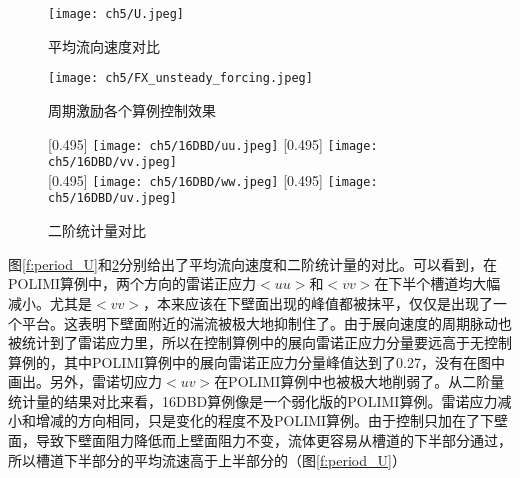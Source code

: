 \begin{figure}[htb]
\begin{minipage}{0.48\textwidth}
  \centering
  \texttt{[image: ch5/U.jpeg]}
  \caption{平均流向速度对比}\label{f:period_U}
\end{minipage}\hfill
\begin{minipage}{0.48\textwidth}
  \centering
  \texttt{[image: ch5/FX\_unsteady\_forcing.jpeg]}
  \caption{周期激励各个算例控制效果}\label{f:period_actuation}
\end{minipage}
\end{figure}
\begin{figure}[htb]
  \centering
  [0.495\textwidth] %
    {\texttt{[image: ch5/16DBD/uu.jpeg]}}%
  [0.495\textwidth]
    {\texttt{[image: ch5/16DBD/vv.jpeg]}}%
  \\\bigskip
  [0.495\textwidth] %
    {\texttt{[image: ch5/16DBD/ww.jpeg]}}%
  [0.495\textwidth]
    {\texttt{[image: ch5/16DBD/uv.jpeg]}}%
  \caption{二阶统计量对比}\label{f:period_2order}
\end{figure}
图\ref{f:period_U}和\ref{f:period_2order}分别给出了平均流向速度和二阶统计量的对比。可以看到，在POLIMI算例中，两个方向的雷诺正应力$<uu>$和$<vv>$在下半个槽道均大幅减小。尤其是$<vv>$，本来应该在下壁面出现的峰值都被抹平，仅仅是出现了一个平台。这表明下壁面附近的湍流被极大地抑制住了。由于展向速度的周期脉动也被统计到了雷诺应力里，所以在控制算例中的展向雷诺正应力分量要远高于无控制算例的，其中POLIMI算例中的展向雷诺正应力分量峰值达到了0.27，没有在图中画出。另外，雷诺切应力$<uv>$在POLIMI算例中也被极大地削弱了。从二阶量统计量的结果对比来看，16DBD算例像是一个弱化版的POLIMI算例。雷诺应力减小和增减的方向相同，只是变化的程度不及POLIMI算例。由于控制只加在了下壁面，导致下壁面阻力降低而上壁面阻力不变，流体更容易从槽道的下半部分通过，所以槽道下半部分的平均流速高于上半部分的（图\ref{f:period_U}）

